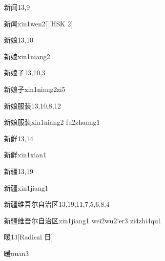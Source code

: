 \begin{entry}{新闻}{13,9}
  \begin{phonetics}{新闻}{xin1wen2}[][HSK 2]
  \end{phonetics}
\end{entry}

\begin{entry}{新娘}{13,10}
  \begin{phonetics}{新娘}{xin1niang2}
  \end{phonetics}
\end{entry}

\begin{entry}{新娘子}{13,10,3}
  \begin{phonetics}{新娘子}{xin1niang2zi5}
  \end{phonetics}
\end{entry}

\begin{entry}{新娘服装}{13,10,8,12}
  \begin{phonetics}{新娘服装}{xin1niang2 fu2zhuang1}
  \end{phonetics}
\end{entry}

\begin{entry}{新鲜}{13,14}
  \begin{phonetics}{新鲜}{xin1xian1}
  \end{phonetics}
\end{entry}

\begin{entry}{新疆}{13,19}
  \begin{phonetics}{新疆}{xin1jiang1}
  \end{phonetics}
\end{entry}

\begin{entry}{新疆维吾尔自治区}{13,19,11,7,5,6,8,4}
  \begin{phonetics}{新疆维吾尔自治区}{xin1jiang1 wei2wu2'er3 zi4zhi4qu1}
  \end{phonetics}
\end{entry}

\begin{entry}{暖}{13}[Radical 日]
  \begin{phonetics}{暖}{nuan3}
  \end{phonetics}
\end{entry}


